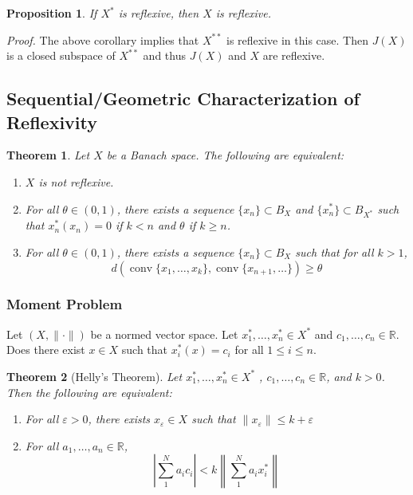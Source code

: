 \documentclass[11pt, reqno]{article}
\theoremstyle{plain}
\newtheorem*{theorem}{Theorem}
\newtheorem*{proposition}{Proposition}
\theoremstyle{definition}
\theoremstyle{remark}
\renewcommand{\epsilon}{\varepsilon}
\newcommand{\RR}{\mathbb{R}}
\begin{document}
\begin{proposition}
    If $X^*$ is reflexive, then $X$ is reflexive. 
\end{proposition}

\textit{Proof.} The above corollary implies that $X^{**}$ is reflexive in this case. Then $J(X)$ is a closed subspace
of $X^{**}$ and thus $J(X)$ and $X$ are reflexive.

\subsection*{Sequential/Geometric Characterization of Reflexivity}

\begin{theorem}
    Let $X$ be a Banach space. The following are equivalent:
    \begin{enumerate}
        \item $X$ is not reflexive.
        \item For all $\theta \in (0,1)$, there exists a sequence $\{x_n\} \subset B_X$ and $\{x_n^*\} \subset B_{X^*}$ 
        such that $x_n^*(x_n) = 0$ if $k < n$ and $\theta$ if $k \geq n$.
        \item For all $\theta \in (0,1)$, there exists a sequence $\{x_n\} \subset B_X$ such that for all $k > 1$,
        \[d(\operatorname{conv}\{x_1, \dots, x_k\}, \operatorname{conv}\{x_{n+1}, \dots\}) \geq \theta\]
    \end{enumerate}
\end{theorem}

\subsubsection*{Moment Problem}

Let $(X, \|\cdot\|)$ be a normed vector space. Let $x_1^*, \dots, x_n^* \in X^*$ and $c_1, \dots, c_n \in \RR$. 
Does there exist $x \in X$ such that $x_i^*(x) = c_i$ for all $1 \leq i \leq n$. 

\begin{theorem}[Helly's Theorem]
    Let $x_1^*,\dots, x_n^* \in X^*$ , $c_1,\dots, c_n \in \RR$, and $k > 0$. Then the following are equivalent:
    \begin{enumerate}
        \item For all $\epsilon > 0$, there exists $x_\epsilon \in X$ such that $\|x_\epsilon\| \leq k + \epsilon$
        \item For all $a_1,\dots, a_n \in \RR$, 
        \[
            \left|\sum_1^N a_i c_i\right| < k\left\| \sum_1^N a_i x_i^*\right\|
        \]
    \end{enumerate}
\end{theorem}
\end{document}
